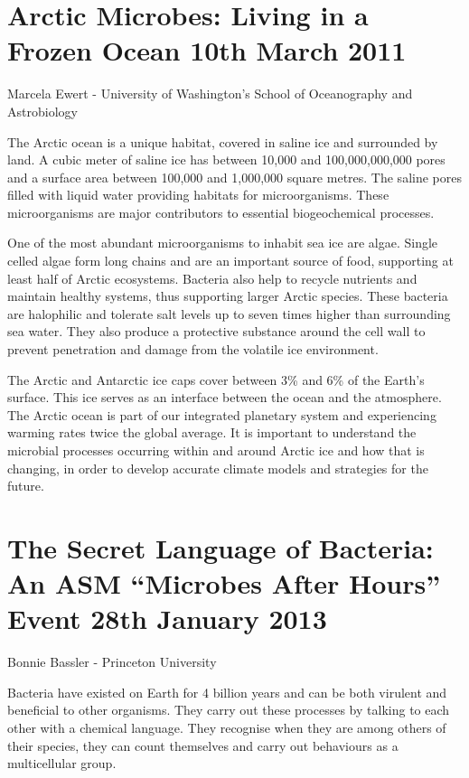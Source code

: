 \documentclass{article}
\begin{document}
\section{Arctic Microbes: Living in a Frozen Ocean 10th March 2011}

Marcela Ewert - University of Washington’s School of Oceanography and Astrobiology \bigskip

\noindent The Arctic ocean is a unique habitat, covered in saline ice and surrounded by land. A cubic meter of saline ice has between 10,000 and 100,000,000,000 pores and a surface area between 100,000 and 1,000,000 square metres. The saline pores filled with liquid water providing habitats for microorganisms. These microorganisms are major contributors to essential biogeochemical processes. \bigskip

\noindent One of the most abundant microorganisms to inhabit sea ice are algae. Single celled algae form long chains and are an important source of food, supporting at least half of Arctic ecosystems. Bacteria also help to recycle nutrients and maintain healthy systems, thus supporting larger Arctic species. These bacteria are halophilic and tolerate salt levels up to seven times higher than surrounding sea water. They also produce a protective substance around the cell wall to prevent penetration and damage from the volatile ice environment. \bigskip

\noindent The Arctic and Antarctic ice caps cover between 3\% and 6\% of the Earth’s surface. This ice serves as an interface between the ocean and the atmosphere. The Arctic ocean is part of our integrated planetary system and experiencing warming rates twice the global average. It is important to understand the microbial processes occurring within and around Arctic ice and how that is changing, in order to develop accurate climate models and strategies for the future.  
  
\section{The Secret Language of Bacteria: An ASM “Microbes After Hours” Event 28th January 2013}  

Bonnie Bassler - Princeton University \bigskip

\noindent Bacteria have existed on Earth for 4 billion years and can be both virulent and beneficial to other organisms. They carry out these processes by talking to each other with a chemical language. They recognise when they are among others of their species, they can count themselves and carry out behaviours as a multicellular group. \bigskip
\end{document}
